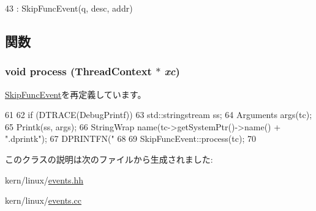 \begin{DoxyCode}
43         : SkipFuncEvent(q, desc, addr) {}
\end{DoxyCode}


\subsection{関数}
\hypertarget{classLinux_1_1DebugPrintkEvent_a7f346b2e15a406283e587b1123735488}{
\subsubsection[{process}]{\setlength{\rightskip}{0pt plus 5cm}void process ({\bf ThreadContext} $\ast$ {\em xc})}}
\label{classLinux_1_1DebugPrintkEvent_a7f346b2e15a406283e587b1123735488}


\hyperlink{classSkipFuncEvent_ad66a9d5ec7cfe597b848a17c0df5cc28}{SkipFuncEvent}を再定義しています。


\begin{DoxyCode}
61 {
62     if (DTRACE(DebugPrintf)) {
63         std::stringstream ss;
64         Arguments args(tc);
65         Printk(ss, args);
66         StringWrap name(tc->getSystemPtr()->name() + ".dprintk");
67         DPRINTFN("%
68     }
69     SkipFuncEvent::process(tc);
70 }
\end{DoxyCode}


このクラスの説明は次のファイルから生成されました:\begin{DoxyCompactItemize}
\item 
kern/linux/\hyperlink{events_8hh}{events.hh}\item 
kern/linux/\hyperlink{events_8cc}{events.cc}\end{DoxyCompactItemize}
